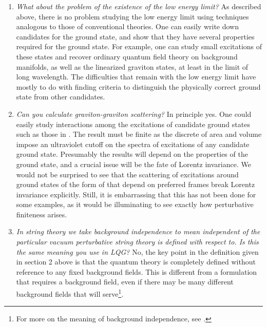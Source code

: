 \documentclass[12pt]{article}
\begin{document}
\begin{enumerate}
\item{}{\it What about the problem of the existence of the low energy limit?}
As described above, there is no problem studying the low energy limit using
techniques analogous to those of conventional theories. One can easily write
down candidates for the ground state, and show that they have several properties required
for the ground state.  For example, one can study small excitations of these states and
recover ordinary quantum field theory on background manifolds, 
as well as the linearized graviton states, 
at least in the limit
of long wavelength.   The difficulties that remain with the low energy limit  have mostly
to do with finding criteria to distinguish the physically correct ground state from other 
candidates. 

\item{}{\it   Can you calculate graviton-graviton scattering? } In principle yes.
One could easily study interactions among the excitations of candidate ground states 
such as those in \cite{weaves,newweaves,morevacuum,coherent,positive}.  
 The result must be finite as the discrete of area and volume
impose  an ultraviolet cutoff on the spectra of excitations of any candidate ground
state.  Presumably the results will depend on the properties of the
ground state, and a crucial issue will be the fate of Lorentz invariance.  We would not be
surprised to see that the scattering of excitations around ground states of the form
of \cite{weaves} that depend on preferred frames break Lorentz invariance explicitly. 
Still, it is embarrassing that this has not been done for some examples, as it would
be illuminating to see exactly how perturbative finiteness arises. 

\item{}{\it In string theory we take {\it background independence} to mean independent of the 
particular vacuum perturbative string theory is defined with respect to. Is this the same 
meaning you use in LQG?}  No, the key point in the definition given in section 2 above is that the
quantum theory is completely defined without reference to any fixed background fields.
This is different from a formulation that requires a background field, even if there may be
many different background fields that will serve\footnote{For more on the
meaning of background independence, see \cite{background}.}.


\end{enumerate}
\end{document}
